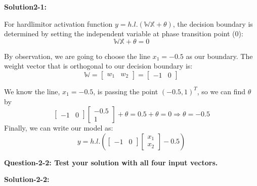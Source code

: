 
\textbf{Solution2-1:}

For hardlimitor activation function $y=h.l.(\mathbb{W}\mathbb{X}+\theta)$, the decision boundary is determined by setting the independent variable at phase transition point (0):
\begin{equation}
    \mathbb{W}\mathbb{X} + \theta  = 0\label{eq2-1-1}
\end{equation}

By observation, we are going to choose the line $x_1=-0.5$ as our boundary. The weight vector that is orthogonal to our decision boundary is:
\[\mathbb{W} = \left[ {\begin{array}{*{20}{c}}
{{w_1}}&{{w_2}}
\end{array}} \right] = \left[ {\begin{array}{*{20}{c}}
-1&0
\end{array}} \right]\]


We know the line, $x_1=-0.5$, is passing the point $(-0.5, 1)^T$, so we can find $\theta$ by
\[\left[ {\begin{array}{*{20}{c}}
-1&0
\end{array}} \right]\left[ {\begin{array}{*{20}{c}}
{ - 0.5}\\
1
\end{array}} \right] + \theta  =  0.5  + \theta  = 0 \Rightarrow \theta  = -0.5\]
Finally, we can write our model as:
\begin{equation}
    \boxed{y = h.l.\left( {\left[ {\begin{array}{*{20}{c}}
-1&0
\end{array}} \right]\left[ {\begin{array}{*{20}{c}}
{{x_1}}\\
{{x_2}}
\end{array}} \right] - 0.5} \right)}
\end{equation}

\textbf{Question-2-2: Test your solution with all four input vectors.}

\textbf{Solution-2-2:}

